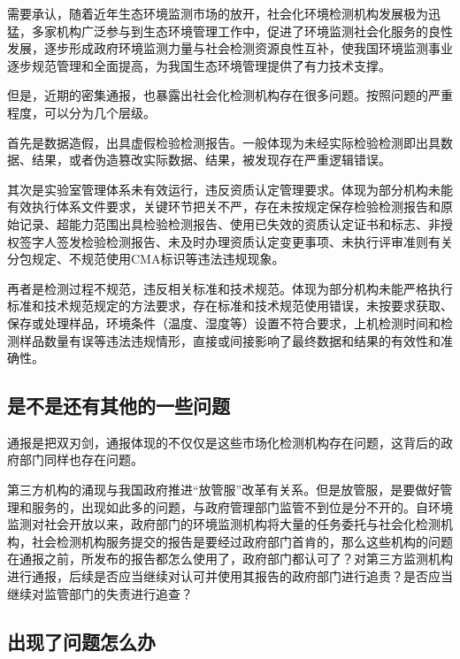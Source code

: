 \documentclass[]{book}
\begin{document}
需要承认，随着近年生态环境监测市场的放开，社会化环境检测机构发展极为迅猛，多家机构广泛参与到生态环境管理工作中，促进了环境监测社会化服务的良性发展，逐步形成政府环境监测力量与社会检测资源良性互补，使我国环境监测事业逐步规范管理和全面提高，为我国生态环境管理提供了有力技术支撑。

但是，近期的密集通报，也暴露出社会化检测机构存在很多问题。按照问题的严重程度，可以分为几个层级。

首先是数据造假，出具虚假检验检测报告。一般体现为未经实际检验检测即出具数据、结果，或者伪造篡改实际数据、结果，被发现存在严重逻辑错误。

其次是实验室管理体系未有效运行，违反资质认定管理要求。体现为部分机构未能有效执行体系文件要求，关键环节把关不严，存在未按规定保存检验检测报告和原始记录、超能力范围出具检验检测报告、使用已失效的资质认定证书和标志、非授权签字人签发检验检测报告、未及时办理资质认定变更事项、未执行评审准则有关分包规定、不规范使用CMA标识等违法违规现象。

再者是检测过程不规范，违反相关标准和技术规范。体现为部分机构未能严格执行标准和技术规范规定的方法要求，存在标准和技术规范使用错误，未按要求获取、保存或处理样品，环境条件（温度、湿度等）设置不符合要求，上机检测时间和检测样品数量有误等违法违规情形，直接或间接影响了最终数据和结果的有效性和准确性。

\hypertarget{ux662fux4e0dux662fux8fd8ux6709ux5176ux4ed6ux7684ux4e00ux4e9bux95eeux9898}{%
\subsection{是不是还有其他的一些问题}\label{ux662fux4e0dux662fux8fd8ux6709ux5176ux4ed6ux7684ux4e00ux4e9bux95eeux9898}}

通报是把双刃剑，通报体现的不仅仅是这些市场化检测机构存在问题，这背后的政府部门同样也存在问题。

第三方机构的涌现与我国政府推进``放管服''改革有关系。但是放管服，是要做好管理和服务的，出现如此多的问题，与政府管理部门监管不到位是分不开的。自环境监测对社会开放以来，政府部门的环境监测机构将大量的任务委托与社会化检测机构，社会检测机构服务提交的报告是要经过政府部门首肯的，那么这些机构的问题在通报之前，所发布的报告都怎么使用了，政府部门都认可了？对第三方监测机构进行通报，后续是否应当继续对认可并使用其报告的政府部门进行追责？是否应当继续对监管部门的失责进行追查？

\hypertarget{ux51faux73b0ux4e86ux95eeux9898ux600eux4e48ux529e}{%
\subsection{出现了问题怎么办}\label{ux51faux73b0ux4e86ux95eeux9898ux600eux4e48ux529e}}
\end{document}
